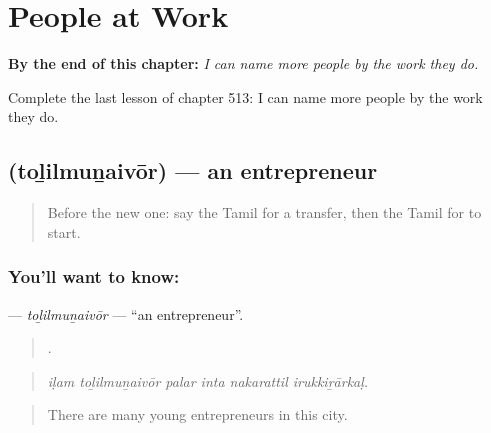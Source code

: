 
\chapter{People at Work}
\label{ch:ta-people-at-work}

\begin{chapteropening}
\textbf{By the end of this chapter:} \emph{I can name more people by the work they do.}

Complete the last lesson of chapter 513: I can name more people by the work they do.
\end{chapteropening}

\section[\texorpdfstring{\ta{தொழில்முனைவோர்} (toḻilmuṉaivōr)}{தொழில்முனைவோர் (toḻilmuṉaivōr)}]{ (toḻilmuṉaivōr) — an entrepreneur}

\label{lesson:TA-C513-tolilmunaivor}



\begin{quote}
Before the new one: say the Tamil for a transfer, then the Tamil for to start.
\end{quote}

\subsection*{You'll want to know: }
\textbf{} — \emph{toḻilmuṉaivōr} — \textquotedblleft{}an entrepreneur\textquotedblright{}.

\begin{quote}
     .
\end{quote}

\begin{quote}
\emph{iḷam toḻilmuṉaivōr palar inta nakarattil irukkiṟārkaḷ.}
\end{quote}

\begin{quote}
There are many young entrepreneurs in this city.
\end{quote}

